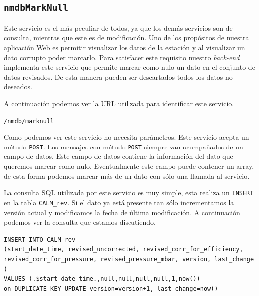 {	\subsection{\texttt{nmdbMarkNull}}
		Este servicio es el más peculiar de todos, ya que los demás servicios son de consulta, mientras que este es de modificación. Uno de
		los propósitos de nuestra aplicación Web es permitir visualizar los datos de la estación y al visualizar un dato corrupto poder
		marcarlo.  Para satisfacer este requisito nuestro \emph{back-end} implementa este servicio que permite marcar como nulo un dato en el
		conjunto de datos revisados. De esta manera pueden ser descartados todos los datos no deseados.
		\par
		A continuación podemos ver la URL utilizada para identificar este servicio.
			\begin{center} \texttt{/nmdb/marknull}  \end{center}
		Como podemos ver este servicio no necesita parámetros. Este servicio acepta un método \texttt{POST}. Los mensajes con método
		\texttt{POST} siempre van acompañados de un campo de datos. Este campo de datos contiene la información del dato que queremos marcar
		como nulo. Eventualmente este campo puede contener un array, de esta forma podemos marcar más de un dato con sólo una llamada al
		servicio.
		\par 
		La consulta SQL utilizada por este servicio es muy simple, esta realiza un \texttt{INSERT} en la tabla \texttt{CALM\_rev}. Si el dato ya
		está presente tan sólo incrementamos la versión actual y modificamos la fecha de última modificación. A continuación podemos ver la
		consulta que estamos discutiendo.
			\begin{center} \texttt{INSERT INTO CALM\_rev 
			  		\\	(start\_date\_time, revised\_uncorrected, revised\_corr\_for\_efficiency, revised\_corr\_for\_pressure, revised\_pressure\_mbar, version, last\_change )
				      	\\	VALUES (\cc.\$start\_date\_time.\cc,null,null,null,null,1,now()) 
				      	\\	on DUPLICATE KEY UPDATE version=version+1, last\_change=now()}
			\end{center} 
}
